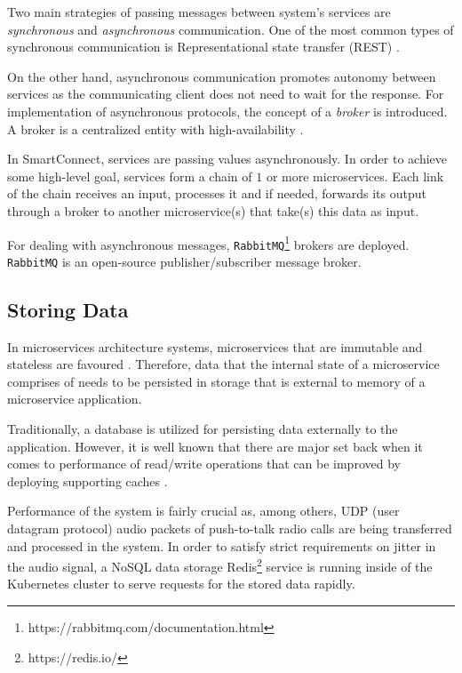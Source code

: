 Two main strategies of passing messages between system's services are \textit{synchronous} and \textit{asynchronous} communication. One of the most common types of synchronous communication is Representational state transfer (REST) \cite{indrasiri2018microservices}.

On the other hand, asynchronous communication promotes autonomy between services as the communicating client does not need to wait for the response. 
For implementation of asynchronous protocols, the concept of a \textit{broker} is introduced. A broker is a centralized entity with high-availability \cite{indrasiri2018microservices}.

In SmartConnect, services are passing values asynchronously. In order to achieve some high-level goal, services form a chain of $1$ or more microservices. Each link of the chain receives an input, processes it and if needed, forwards its output through a broker to another microservice(s) that take(s) this data as input.

For dealing with asynchronous messages, \texttt{RabbitMQ}\footnote{https://rabbitmq.com/documentation.html} brokers are deployed.
\texttt{RabbitMQ} is an open-source publisher/subscriber message broker.

\subsection{Storing Data}
\label{architecture:caching}
In microservices architecture systems, microservices that are immutable and stateless are favoured \cite{indrasiri2018microservices}. 
Therefore, data that the internal state of a microservice comprises of needs to be persisted in storage that is external to memory of a microservice application.

Traditionally, a database is utilized for persisting data externally to the application. However, it is well known that there are major set back when it comes to performance of read/write operations that can be improved by deploying supporting caches \cite{elhardt1984database}.

Performance of the system is fairly crucial as, among others, UDP (user datagram protocol) audio packets of push-to-talk radio calls are being transferred and processed in the system. 
In order to satisfy strict requirements on jitter in the audio signal, a NoSQL data storage Redis\footnote{https://redis.io/} service is running inside of the Kubernetes cluster to serve requests for the stored data rapidly.
